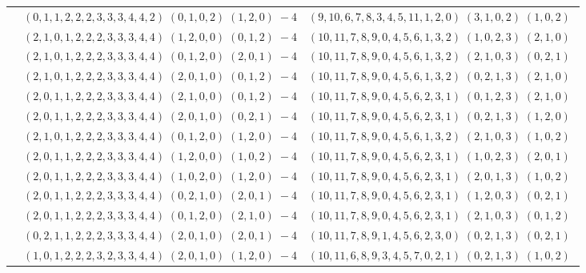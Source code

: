 \documentclass[11pt]{article}
\begin{document}
\begin{longtable}[l]{|c|c|c|}
 \cline{2-3} 
 & $(0 ,1 ,1 ,2 ,2 ,2 ,3 ,3 ,3 ,4 ,4 ,2) \;(0 ,1 ,0 ,2) \;(1 ,2 ,0) \;-4$ & $(9 ,10 ,6 ,7 ,8 ,3 ,4 ,5 ,11 ,1 ,2 ,0) \;(3 ,1 ,0 ,2) \;(1 ,0 ,2) \;$\\ 
 \cline{2-3} 
 & $(2 ,1 ,0 ,1 ,2 ,2 ,2 ,3 ,3 ,3 ,4 ,4) \;(1 ,2 ,0 ,0) \;(0 ,1 ,2) \;-4$ & $(10 ,11 ,7 ,8 ,9 ,0 ,4 ,5 ,6 ,1 ,3 ,2) \;(1 ,0 ,2 ,3) \;(2 ,1 ,0) \;$\\ 
 \cline{2-3} 
 & $(2 ,1 ,0 ,1 ,2 ,2 ,2 ,3 ,3 ,3 ,4 ,4) \;(0 ,1 ,2 ,0) \;(2 ,0 ,1) \;-4$ & $(10 ,11 ,7 ,8 ,9 ,0 ,4 ,5 ,6 ,1 ,3 ,2) \;(2 ,1 ,0 ,3) \;(0 ,2 ,1) \;$\\ 
 \cline{2-3} 
 & $(2 ,1 ,0 ,1 ,2 ,2 ,2 ,3 ,3 ,3 ,4 ,4) \;(2 ,0 ,1 ,0) \;(0 ,1 ,2) \;-4$ & $(10 ,11 ,7 ,8 ,9 ,0 ,4 ,5 ,6 ,1 ,3 ,2) \;(0 ,2 ,1 ,3) \;(2 ,1 ,0) \;$\\ 
 \cline{2-3} 
 & $(2 ,0 ,1 ,1 ,2 ,2 ,2 ,3 ,3 ,3 ,4 ,4) \;(2 ,1 ,0 ,0) \;(0 ,1 ,2) \;-4$ & $(10 ,11 ,7 ,8 ,9 ,0 ,4 ,5 ,6 ,2 ,3 ,1) \;(0 ,1 ,2 ,3) \;(2 ,1 ,0) \;$\\ 
 \cline{2-3} 
 & $(2 ,0 ,1 ,1 ,2 ,2 ,2 ,3 ,3 ,3 ,4 ,4) \;(2 ,0 ,1 ,0) \;(0 ,2 ,1) \;-4$ & $(10 ,11 ,7 ,8 ,9 ,0 ,4 ,5 ,6 ,2 ,3 ,1) \;(0 ,2 ,1 ,3) \;(1 ,2 ,0) \;$\\ 
 \cline{2-3} 
 & $(2 ,1 ,0 ,1 ,2 ,2 ,2 ,3 ,3 ,3 ,4 ,4) \;(0 ,1 ,2 ,0) \;(1 ,2 ,0) \;-4$ & $(10 ,11 ,7 ,8 ,9 ,0 ,4 ,5 ,6 ,1 ,3 ,2) \;(2 ,1 ,0 ,3) \;(1 ,0 ,2) \;$\\ 
 \cline{2-3} 
 & $(2 ,0 ,1 ,1 ,2 ,2 ,2 ,3 ,3 ,3 ,4 ,4) \;(1 ,2 ,0 ,0) \;(1 ,0 ,2) \;-4$ & $(10 ,11 ,7 ,8 ,9 ,0 ,4 ,5 ,6 ,2 ,3 ,1) \;(1 ,0 ,2 ,3) \;(2 ,0 ,1) \;$\\ 
 \cline{2-3} 
 & $(2 ,0 ,1 ,1 ,2 ,2 ,2 ,3 ,3 ,3 ,4 ,4) \;(1 ,0 ,2 ,0) \;(1 ,2 ,0) \;-4$ & $(10 ,11 ,7 ,8 ,9 ,0 ,4 ,5 ,6 ,2 ,3 ,1) \;(2 ,0 ,1 ,3) \;(1 ,0 ,2) \;$\\ 
 \cline{2-3} 
 & $(2 ,0 ,1 ,1 ,2 ,2 ,2 ,3 ,3 ,3 ,4 ,4) \;(0 ,2 ,1 ,0) \;(2 ,0 ,1) \;-4$ & $(10 ,11 ,7 ,8 ,9 ,0 ,4 ,5 ,6 ,2 ,3 ,1) \;(1 ,2 ,0 ,3) \;(0 ,2 ,1) \;$\\ 
 \cline{2-3} 
 & $(2 ,0 ,1 ,1 ,2 ,2 ,2 ,3 ,3 ,3 ,4 ,4) \;(0 ,1 ,2 ,0) \;(2 ,1 ,0) \;-4$ & $(10 ,11 ,7 ,8 ,9 ,0 ,4 ,5 ,6 ,2 ,3 ,1) \;(2 ,1 ,0 ,3) \;(0 ,1 ,2) \;$\\ 
 \cline{2-3} 
 & $(0 ,2 ,1 ,1 ,2 ,2 ,2 ,3 ,3 ,3 ,4 ,4) \;(2 ,0 ,1 ,0) \;(2 ,0 ,1) \;-4$ & $(10 ,11 ,7 ,8 ,9 ,1 ,4 ,5 ,6 ,2 ,3 ,0) \;(0 ,2 ,1 ,3) \;(0 ,2 ,1) \;$\\ 
 \cline{2-3} 
 & $(1 ,0 ,1 ,2 ,2 ,2 ,3 ,2 ,3 ,3 ,4 ,4) \;(2 ,0 ,1 ,0) \;(1 ,2 ,0) \;-4$ & $(10 ,11 ,6 ,8 ,9 ,3 ,4 ,5 ,7 ,0 ,2 ,1) \;(0 ,2 ,1 ,3) \;(1 ,0 ,2) \;$\\ 

\end{longtable}
\end{document}
